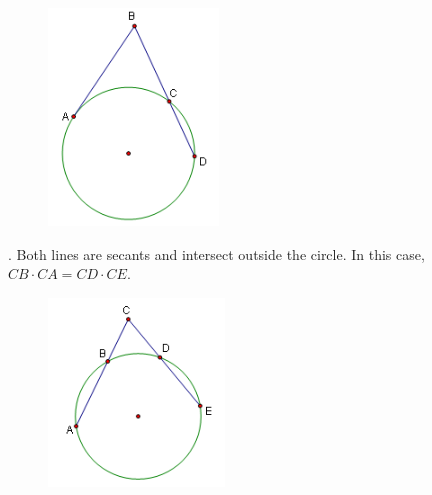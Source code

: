         \begin{figure} [hbt!]
            \centering
            \includegraphics[scale=0.75]{Resources/Unit4Circles/power2.PNG}
        \end{figure}

        \pagebreak
        . Both lines are secants and intersect outside the circle. In this case,
        $CB\cdot CA = CD\cdot CE$. \\

        \begin{figure} [hbt!]
            \centering
            \includegraphics[scale=0.75]{Resources/Unit4Circles/power3.PNG}
        \end{figure}